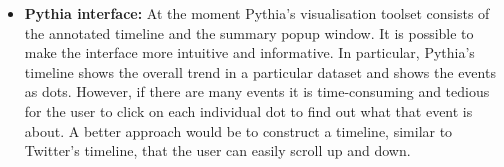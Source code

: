 \begin{itemize}
  \item \textbf{Pythia interface:} At the moment Pythia's visualisation toolset consists of the annotated timeline and the summary popup window. It is possible to make the interface more intuitive and informative. In particular, Pythia's timeline shows the overall trend in a particular dataset and shows the events as dots. However, if there are many events it is time-consuming and tedious for the user to click on each individual dot to find out what that event is about. A better approach would be to construct a timeline, similar to Twitter's timeline, that the user can easily scroll up and down.     
\end{itemize}\vspace{15pt}



